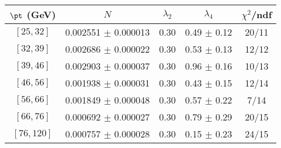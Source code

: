\begin{tabular}{c||c|c|c|c}
$\pt$ (GeV) & $N$ & $\lambda_{2}$ & $\lambda_4$  & $\chi^2$/ndf  \\
\hline
$[25, 32]$ & 0.002551 $\pm$ 0.000013 & 0.30 & 0.49 $\pm$ 0.12 & 20/11\\
$[32, 39]$ & 0.002686 $\pm$ 0.000022 & 0.30 & 0.53 $\pm$ 0.13 & 12/12\\
$[39, 46]$ & 0.002903 $\pm$ 0.000037 & 0.30 & 0.96 $\pm$ 0.16 & 10/13\\
$[46, 56]$ & 0.001938 $\pm$ 0.000031 & 0.30 & 0.43 $\pm$ 0.15 & 12/14\\
$[56, 66]$ & 0.001849 $\pm$ 0.000048 & 0.30 & 0.57 $\pm$ 0.22 & 7/14\\
$[66, 76]$ & 0.000692 $\pm$ 0.000027 & 0.30 & 0.79 $\pm$ 0.29 & 20/15\\
$[76, 120]$ & 0.000757 $\pm$ 0.000028 & 0.30 & 0.15 $\pm$ 0.23 & 24/15\\
\end{tabular}
